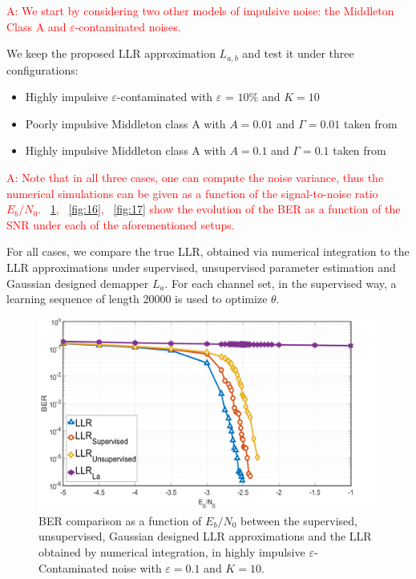 \documentclass[a4paper]{IEEEtran}
\begin{document}
\textcolor{red}{A: We start by considering two other models
  of impulsive noise: the Middleton Class A and
  $\varepsilon$-contaminated noises. }

We keep the proposed LLR approximation $L_{a,b}$ and test it
under three configurations:
\begin{itemize}
\item Highly impulsive $\varepsilon$-contaminated with
  \(\varepsilon\) = $10\%$ and $K=10$
\item Poorly impulsive Middleton class A with $A = 0.01$ and
  \(\Gamma=0.01\) taken from~\cite{NF-2009}
\item Highly impulsive Middleton class A with $A = 0.1$ and
  \(\Gamma=0.1\) taken from~\cite{YDMY-2017}
\end{itemize}

\textcolor{red}{A: Note that in all three cases, one can
  compute the noise variance, thus the numerical simulations
  can be given as a function of the signal-to-noise ratio
  $E_b/N_0$. \figurename~\ref{fig:15},
  \figurename~\ref{fig:16}, \figurename~\ref{fig:17} show
  the evolution of the BER as a function of the SNR under
  each of the aforementioned setups.}

For all cases, we compare the true LLR, obtained via
numerical integration to the LLR approximations under
supervised, unsupervised parameter estimation and Gaussian
designed demapper $L_a$. For each channel set, in the
supervised way, a learning sequence of length 20000 is used
to optimize $\theta$.

\begin{figure}
  \centering \includegraphics[width=\linewidth]{fig-15}
  \caption{BER comparison as a function of $E_b/N_0$ between
    the supervised, unsupervised, Gaussian designed LLR
    approximations and the LLR obtained by numerical
    integration, in highly impulsive
    $\varepsilon$-Contaminated noise with $\varepsilon=0.1$
    and $K=10$.}
  \label{fig:15}
\end{figure}
\end{document}
